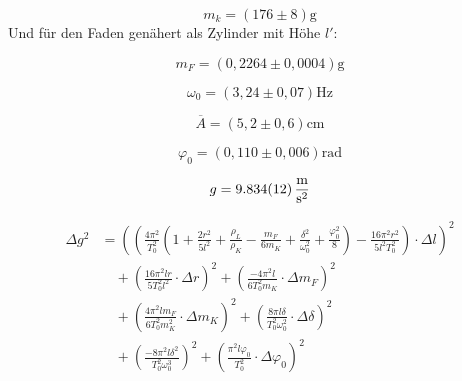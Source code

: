\[m_k = (176 \pm 8) \si{\gram}\]
Und für den Faden genähert als Zylinder mit Höhe $l'$:

\[m_F = (0,2264 \pm 0,0004) \si{\gram}\]

\[ \omega_0 = (3,24 \pm 0,07) \si{\Hz} \]


\[ \overline{A} = (5,2 \pm 0,6) \si{\cm}\]

\[\varphi_0 =( 0,110 \pm 0,006 )\si{\text{rad}}\]

\[g = \SI{9,834 \pm 0,012}{\frac{\meter}{\second^2}}\]

\begin{align}
\Delta g^{2} 
&= \left( 
    \left( 
        \frac{4\pi^{2}}{T_{0}^{2}}
        \left( 
            1 + \frac{2r^{2}}{5l^{2}} + \frac{\rho_{L}}{\rho_{K}} 
            - \frac{m_{F}}{6m_{K}} + \frac{\delta^{2}}{\omega_{0}^{2}} 
            + \frac{\varphi_{0}^{2}}{8} 
        \right) 
        - \frac{16\pi^{2}r^{2}}{5l^{2}T_{0}^{2}} 
    \right) \cdot \Delta l 
\right)^{2} \\[1ex]
&\quad + \left( 
    \frac{16\pi^{2}lr}{5T_{0}^{2}l^{2}} \cdot \Delta r 
\right)^{2} 
+ \left( 
    \frac{-4\pi^{2}l}{6T_{0}^{2}m_{K}} \cdot \Delta m_{F} 
\right)^{2} \\[1ex]
&\quad + \left( 
    \frac{4\pi^{2}lm_{F}}{6T_{0}^{2}m_{K}^{2}} \cdot \Delta m_{K} 
\right)^{2} 
+ \left( 
    \frac{8\pi l \delta}{T_{0}^{2}\omega_{0}^{2}} \cdot \Delta \delta 
\right)^{2} \\[1ex]
&\quad + \left( 
    \frac{-8\pi^{2}l\delta^{2}}{T_{0}^{2}\omega_{0}^{3}} 
\right)^{2} 
+ \left( 
    \frac{\pi^{2}l\varphi_{0}}{T_{0}^{2}} \cdot \Delta \varphi_{0} 
\right)^{2}
\end{align}
